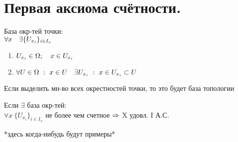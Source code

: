 \documentclass[geometry.tex]{subfiles}
\begin{document}
  \section{Первая аксиома счётности.}

  \begin{definition}
      База окр-тей точки:\\
      $\forall x \quad \exists \{U_{x_i}\}_{i \in I_x}$
      \begin{enumerate}
          \item $U_{x_i} \in \Omega; \quad x \in U_{x_i}$
          \item $\forall U \in \Omega \ : \ x \in U \quad \exists U_{x_i} \ : \ x \in U_{x_i} \subset U$
      \end{enumerate}
  \end{definition}

  \begin{remark}
      Если выделить мн-во всех окрестностей точки, то это будет база топологии
  \end{remark}

  \begin{definition}
      Если $\exists$  база окр-тей:\\
      $\forall x \ \{U_{x_i}\}_{i \in I_x}$ не более чем счетное $\Rightarrow$ X удовл. I А.С.
  \end{definition}

  \begin{examples}
      *здесь когда-нибудь будут примеры*
  \end{examples}
\end{document}
